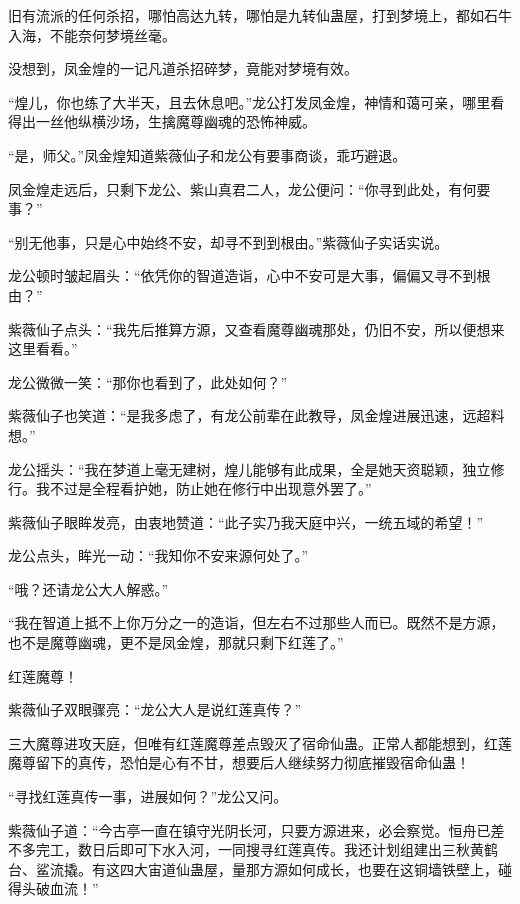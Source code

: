 \begin{this_body}
旧有流派的任何杀招，哪怕高达九转，哪怕是九转仙蛊屋，打到梦境上，都如石牛入海，不能奈何梦境丝毫。

没想到，凤金煌的一记凡道杀招碎梦，竟能对梦境有效。

“煌儿，你也练了大半天，且去休息吧。”龙公打发凤金煌，神情和蔼可亲，哪里看得出一丝他纵横沙场，生擒魔尊幽魂的恐怖神威。

“是，师父。”凤金煌知道紫薇仙子和龙公有要事商谈，乖巧避退。

凤金煌走远后，只剩下龙公、紫山真君二人，龙公便问：“你寻到此处，有何要事？”

“别无他事，只是心中始终不安，却寻不到到根由。”紫薇仙子实话实说。

龙公顿时皱起眉头：“依凭你的智道造诣，心中不安可是大事，偏偏又寻不到根由？”

紫薇仙子点头：“我先后推算方源，又查看魔尊幽魂那处，仍旧不安，所以便想来这里看看。”

龙公微微一笑：“那你也看到了，此处如何？”

紫薇仙子也笑道：“是我多虑了，有龙公前辈在此教导，凤金煌进展迅速，远超料想。”

龙公摇头：“我在梦道上毫无建树，煌儿能够有此成果，全是她天资聪颖，独立修行。我不过是全程看护她，防止她在修行中出现意外罢了。”

紫薇仙子眼眸发亮，由衷地赞道：“此子实乃我天庭中兴，一统五域的希望！”

龙公点头，眸光一动：“我知你不安来源何处了。”

“哦？还请龙公大人解惑。”

“我在智道上抵不上你万分之一的造诣，但左右不过那些人而已。既然不是方源，也不是魔尊幽魂，更不是凤金煌，那就只剩下红莲了。”

红莲魔尊！

紫薇仙子双眼骤亮：“龙公大人是说红莲真传？”

三大魔尊进攻天庭，但唯有红莲魔尊差点毁灭了宿命仙蛊。正常人都能想到，红莲魔尊留下的真传，恐怕是心有不甘，想要后人继续努力彻底摧毁宿命仙蛊！

“寻找红莲真传一事，进展如何？”龙公又问。

紫薇仙子道：“今古亭一直在镇守光阴长河，只要方源进来，必会察觉。恒舟已差不多完工，数日后即可下水入河，一同搜寻红莲真传。我还计划组建出三秋黄鹤台、鲨流撬。有这四大宙道仙蛊屋，量那方源如何成长，也要在这铜墙铁壁上，碰得头破血流！”

\end{this_body}

